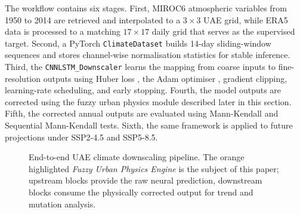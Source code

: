 \documentclass[conference]{IEEEtran}
\begin{document}
The workflow contains six stages. First, MIROC6 atmospheric variables from 1950 to 2014 are retrieved and interpolated to a \(3\times3\) UAE grid, while ERA5 data is processed to a matching \(17\times17\) daily grid that serves as the supervised target. Second, a PyTorch \texttt{ClimateDataset} builds 14-day sliding-window sequences and stores channel-wise normalisation statistics for stable inference. Third, the \texttt{CNNLSTM\_Downscaler} learns the mapping from coarse inputs to fine-resolution outputs using Huber loss \cite{huber1964robust}, the Adam optimiser \cite{kingma2015adam}, gradient clipping, learning-rate scheduling, and early stopping. Fourth, the model outputs are corrected using the fuzzy urban physics module described later in this section. Fifth, the corrected annual outputs are evaluated using Mann-Kendall and Sequential Mann-Kendall tests. Sixth, the same framework is applied to future projections under SSP2-4.5 and SSP5-8.5.

\begin{figure}[!t]

\centering
{}
\caption{End-to-end UAE climate downscaling pipeline.  The orange
highlighted \emph{Fuzzy Urban Physics Engine} is the subject of this
paper; upstream blocks provide the raw neural prediction, downstream
blocks consume the physically corrected output for trend and mutation
analysis.}
\label{fig:pipeline}
\end{figure}
\end{document}
